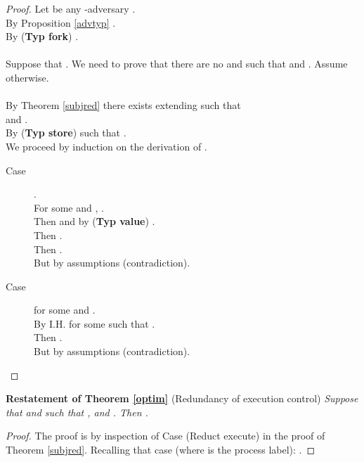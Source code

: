 \documentclass{sigplanconf}
\newcommand{\trule}[1]{(\textbf{Typ #1})}
\begin{document}
\begin{proof} Let  be any -adversary . \\
By Proposition \ref{advtyp} . \\
By \trule{fork} . \\
\\
Suppose that . We need to prove that there are no  and  such that 
and . Assume otherwise.\\
\\
By Theorem \ref{subjred} there exists  extending  such that \\
 and .\\
By \trule{store}  such that .\\
We proceed by induction on the derivation of .
\begin{description}
\item[Case] .\\
For some  and , .\\
Then  and by \trule{value} .\\
Then .\\
Then .\\
But by assumptions  (contradiction).
\item[Case]  for some  and .\\
By I.H.  for some  such that .\\
Then .\\
But by assumptions  (contradiction). \qedhere
\end{description}
\end{proof}
\noindent
{\bf Restatement of Theorem \ref{optim}} (Redundancy of execution control) {\em Suppose that  and  
 such that , and . Then .
}
\begin{proof} The proof is by inspection of Case (Reduct execute) in the proof of Theorem \ref{subjred}. Recalling that case (where  is the process label): .
\end{proof}
\end{document}
